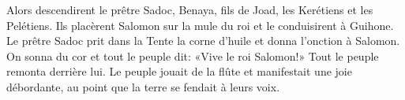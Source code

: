 Alors descendirent le prêtre Sadoc, Benaya, fils de Joad, les Kerétiens et les Pelétiens.
	Ils placèrent Salomon sur la mule du roi et le conduisirent à Guihone.
Le prêtre Sadoc prit dans la Tente la corne d’huile et donna l’onction à Salomon.
	On sonna du cor et tout le peuple dit: «Vive le roi Salomon!»
Tout le peuple remonta derrière lui.
Le peuple jouait de la flûte et manifestait une joie débordante,
	au point que la terre se fendait à leurs voix.
